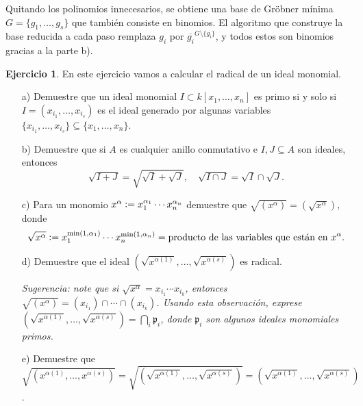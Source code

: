 \documentclass{article}
\theoremstyle{definition}
\newtheorem{ejerc}{Ejercicio}
\begin{document}
\vspace{1em}

Quitando los polinomios innecesarios, se obtiene una base de Gröbner mínima
$G = \{ g_1, \ldots, g_s \}$ que también consiste en binomios. El algoritmo que
construye la base reducida a cada paso remplaza $g_i$ por
$\overline{g_i}^{G\setminus \{ g_i \}}$, y todos estos son binomios gracias a la
parte b).

\newpage
\fi


\begin{ejerc}
  En este ejercicio vamos a calcular el radical de un ideal monomial.

  \begin{enumerate}
  \item[a)] Demuestre que un ideal monomial $I \subset k [x_1,\ldots,x_n]$ es
    primo si y solo si $I = (x_{i_1}, \ldots, x_{i_s})$ es el ideal generado por
    algunas variables
    $\{ x_{i_1}, \ldots, x_{i_s} \} \subseteq \{ x_1, \ldots, x_n \}$.

  \item[b)] Demuestre que si $A$ es cualquier anillo conmutativo e
    $I,J \subseteq A$ son ideales, entonces
    \[ \sqrt{I+J} = \sqrt{\sqrt{I} + \sqrt{J}}, \quad
       \sqrt{I\cap J} = \sqrt{I}\cap \sqrt{J}. \]

  \item[c)] Para un monomio $x^\alpha \mathrel{\mathop:}= x_1^{\alpha_1}\cdots x_n^{\alpha_n}$
    demuestre que $\sqrt{(x^\alpha)} = (\sqrt{x^\alpha})$, donde
    \[ \sqrt{x^\alpha} \mathrel{\mathop:}=
       x_1^{\min(1,\alpha_1)}\cdots x_n^{\min(1,\alpha_n)} =
       \text{producto de las variables que están en }x^\alpha. \]

  \item[d)] Demuestre que el ideal
    $(\sqrt{x^{\alpha (1)}}, \ldots, \sqrt{x^{\alpha (s)}})$ es radical.

    \noindent \emph{Sugerencia: note que si
      $\sqrt{x^{\alpha}} = x_{i_1}\cdots x_{i_k}$, entonces
      $\sqrt{(x^{\alpha})} = (x_{i_1})\cap\cdots\cap (x_{i_k})$. Usando esta
      observación, exprese
      $(\sqrt{x^{\alpha (1)}}, \ldots, \sqrt{x^{\alpha (s)}}) =
       \bigcap_i\mathfrak{p}_i$, donde $\mathfrak{p}_i$
      son algunos ideales monomiales primos.}

  \item[e)] Demuestre que
    $\sqrt{(x^{\alpha (1)}, \ldots, x^{\alpha (s)})} =
     \sqrt{(\sqrt{x^{\alpha (1)}}, \ldots, \sqrt{x^{\alpha (s)}})} =
     (\sqrt{x^{\alpha (1)}}, \ldots, \sqrt{x^{\alpha (s)}})$.
  \end{enumerate}
\end{ejerc}
\end{document}
